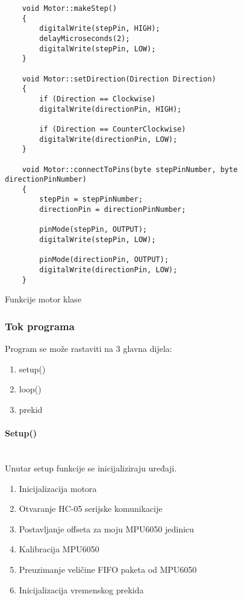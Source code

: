 \documentclass[../Document.tex]{subfiles}
\begin{document}
\begin{code}
    \begin{verbatim}
    void Motor::makeStep()
    {
        digitalWrite(stepPin, HIGH);
        delayMicroseconds(2);
        digitalWrite(stepPin, LOW);
    }

    void Motor::setDirection(Direction Direction)
    {
        if (Direction == Clockwise)
        digitalWrite(directionPin, HIGH);

        if (Direction == CounterClockwise)
        digitalWrite(directionPin, LOW);
    }

    void Motor::connectToPins(byte stepPinNumber, byte directionPinNumber)
    {
        stepPin = stepPinNumber;
        directionPin = directionPinNumber;
        
        pinMode(stepPin, OUTPUT);
        digitalWrite(stepPin, LOW);

        pinMode(directionPin, OUTPUT);
        digitalWrite(directionPin, LOW);
    }
    \end{verbatim}
    \caption{Funkcije motor klase}
\end{code}

\subsubsection{Tok programa}
Program se može rastaviti na 3 glavna dijela:

\begin{enumerate}
    \item setup()
    \item loop()
    \item prekid
\end{enumerate}

\paragraph{Setup()}\mbox{}\\
\noindent Unutar setup funkcije se inicijaliziraju uređaji.

\begin{enumerate}
    \item Inicijalizacija motora
    \item Otvaranje HC-05 serijske komunikacije
    \item Postavljanje offseta za moju MPU6050 jedinicu
    \item Kalibracija MPU6050
    \item Preuzimanje veličine FIFO paketa od MPU6050
    \item Inicijalizacija vremenskog prekida
\end{enumerate}
\end{document}
